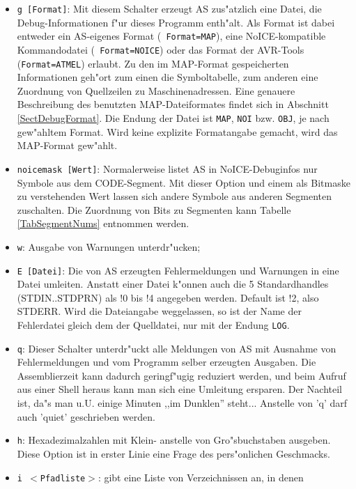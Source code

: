 \documentclass[12pt,a4paper,twoside]{report}
\newcommand{\tty}[1]{{\tt #1}}
\begin{document}
\begin{itemize}
\item{\tty{g [Format]}: Mit diesem Schalter erzeugt AS zus"atzlich eine
      Datei, die Debug-Informationen f"ur dieses Programm enth"alt.
      Als Format ist dabei entweder ein AS-eigenes Format ({\tt
      Format=MAP}), eine NoICE-kompatible Kommandodatei ({\tt
      Format=NOICE}) oder das Format der AVR-Tools ({\tt Format=ATMEL})
      erlaubt.  Zu den im MAP-Format gespeicherten
      Informationen geh"ort zum einen die Symboltabelle, zum anderen eine
      Zuordnung von Quellzeilen zu Maschinenadressen.  Eine genauere
      Beschreibung des benutzten MAP-Dateiformates findet sich in
      Abschnitt \ref{SectDebugFormat}.  Die Endung der Datei ist
      \tty{MAP}, \tty{NOI} bzw. \tty{OBJ}, je nach gew"ahltem Format.
      Wird keine explizite Formatangabe gemacht, wird das MAP-Format
      gew"ahlt.}
\item{\tty{noicemask [Wert]}: Normalerweise listet AS in NoICE-Debuginfos
      nur Symbole aus dem CODE-Segment.  Mit dieser Option und einem als
      Bitmaske zu verstehenden Wert lassen sich andere Symbole aus
      anderen Segmenten zuschalten.  Die Zuordnung von Bits zu Segmenten
      kann Tabelle \ref{TabSegmentNums} entnommen werden.}
\item{\tty{w}: Ausgabe von Warnungen unterdr"ucken;}
\item{\tty{E [Datei]}: Die von AS erzeugten Fehlermeldungen und Warnungen
      in eine Datei umleiten.  Anstatt einer Datei k"onnen auch die 5
      Standardhandles (STDIN..STDPRN) als !0 bis !4 angegeben werden.
      Default ist !2, also STDERR. Wird die Dateiangabe weggelassen,
      so ist der Name der Fehlerdatei gleich dem der Quelldatei, nur
      mit der Endung \tty{LOG}.}
\item{\tty{q}: Dieser Schalter unterdr"uckt alle Meldungen von AS mit
      Ausnahme von Fehlermeldungen und vom Programm selber erzeugten
      Ausgaben.  Die Assemblierzeit kann dadurch geringf"ugig reduziert
      werden, und beim Aufruf aus einer Shell heraus kann man sich eine
      Umleitung ersparen.  Der Nachteil ist, da"s man u.U. einige Minuten
      ,,im Dunklen'' steht...  Anstelle von 'q' darf auch 'quiet' geschrieben
      werden.}
\item{\tty{h}: Hexadezimalzahlen mit Klein- anstelle von Gro"sbuchstaben ausgeben.
      Diese Option ist in erster Linie eine Frage des pers"onlichen
      Geschmacks.}
\item{\tty{i $<$Pfadliste$>$}: gibt eine Liste von Verzeichnissen an, in denen
}
\end{itemize}
\end{document}
